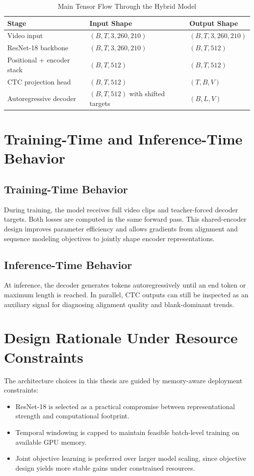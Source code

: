 \begin{table}[H]
\centering
\caption{Main Tensor Flow Through the Hybrid Model}
\label{tab:tensor_flow}
\begin{tabular}{@{}p{4.0cm}p{4.8cm}p{4.8cm}@{}}
\toprule
\textbf{Stage} & \textbf{Input Shape} & \textbf{Output Shape} \\
\midrule
Video input & $(B, T, 3, 260, 210)$ & $(B, T, 3, 260, 210)$ \\
ResNet-18 backbone & $(B, T, 3, 260, 210)$ & $(B, T, 512)$ \\
Positional + encoder stack & $(B, T, 512)$ & $(B, T, 512)$ \\
CTC projection head & $(B, T, 512)$ & $(T, B, V)$ \\
Autoregressive decoder & $(B, T, 512)$ with shifted targets & $(B, L, V)$ \\
\bottomrule
\end{tabular}
\end{table}

\section{Training-Time and Inference-Time Behavior}

\subsection{Training-Time Behavior}

During training, the model receives full video clips and teacher-forced decoder targets. Both losses are computed in the same forward pass. This shared-encoder design improves parameter efficiency and allows gradients from alignment and sequence modeling objectives to jointly shape encoder representations.

\subsection{Inference-Time Behavior}

At inference, the decoder generates tokens autoregressively until an end token or maximum length is reached. In parallel, CTC outputs can still be inspected as an auxiliary signal for diagnosing alignment quality and blank-dominant trends.

\section{Design Rationale Under Resource Constraints}

The architecture choices in this thesis are guided by memory-aware deployment constraints:
\begin{itemize}
    \item ResNet-18 is selected as a practical compromise between representational strength and computational footprint.
    \item Temporal windowing is capped to maintain feasible batch-level training on available GPU memory.
    \item Joint objective learning is preferred over larger model scaling, since objective design yields more stable gains under constrained resources.
\end{itemize}
